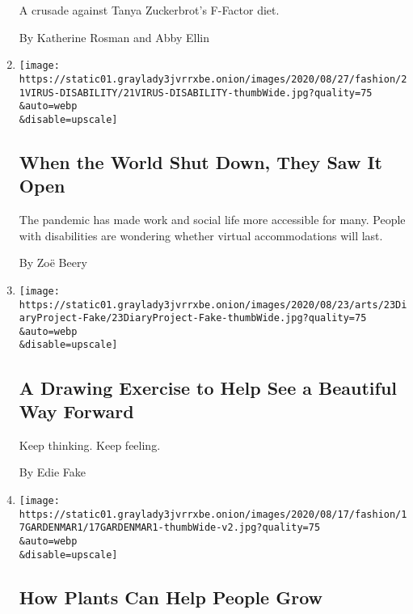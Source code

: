 \begin{enumerate}
  A crusade against Tanya Zuckerbrot's F-Factor diet.

  By Katherine Rosman and Abby Ellin
\item
  \href{/2020/08/24/style/disability-accessibility-coronavirus.html}{}

  \texttt{[image: https://static01.graylady3jvrrxbe.onion/images/2020/08/27/fashion/21VIRUS-DISABILITY/21VIRUS-DISABILITY-thumbWide.jpg?quality=75\\\&auto=webp\\\&disable=upscale]}

  \hypertarget{when-the-world-shut-down-they-saw-it-open}{%
  \subsection{When the World Shut Down, They Saw It
  Open}\label{when-the-world-shut-down-they-saw-it-open}}

  The pandemic has made work and social life more accessible for many.
  People with disabilities are wondering whether virtual accommodations
  will last.

  By Zoë Beery
\item
  \href{/2020/08/21/arts/drawing-flower-meditation.html}{}

  \texttt{[image: https://static01.graylady3jvrrxbe.onion/images/2020/08/23/arts/23DiaryProject-Fake/23DiaryProject-Fake-thumbWide.jpg?quality=75\\\&auto=webp\\\&disable=upscale]}

  \hypertarget{a-drawing-exercise-to-help-see-a-beautiful-way-forward}{%
  \subsection{A Drawing Exercise to Help See a Beautiful Way
  Forward}\label{a-drawing-exercise-to-help-see-a-beautiful-way-forward}}

  Keep thinking. Keep feeling.

  By Edie Fake
\item
  \href{/2020/08/18/style/self-care/self-care-plants-garden-marcus-tiktok.html}{}

  \texttt{[image: https://static01.graylady3jvrrxbe.onion/images/2020/08/17/fashion/17GARDENMAR1/17GARDENMAR1-thumbWide-v2.jpg?quality=75\\\&auto=webp\\\&disable=upscale]}

  \hypertarget{how-plants-can-help-people-grow}{%
  \subsection{How Plants Can Help People
  Grow}\label{how-plants-can-help-people-grow}}


\end{enumerate}
